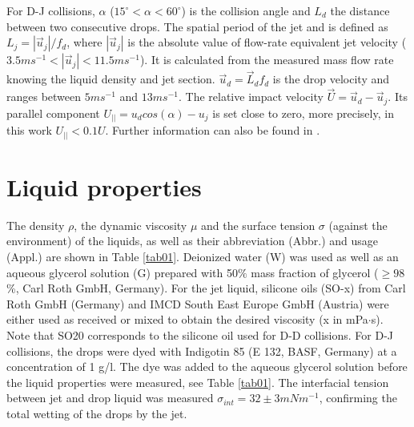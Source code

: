 \documentclass{article}
\begin{document}
For D-J collisions, $\alpha$ ($15^\circ < \alpha < 60^\circ$) is the collision angle and $L_{d}$  the distance between two consecutive drops. The spatial period of the jet and is defined as $L_j=|\vec{u}_j|/f_{d}$, where $|\vec{u}_j|$ is the absolute value of flow-rate equivalent jet velocity ($3.5 ms^{-1}<|\vec{u}_j|<11.5 ms^{-1}$). It is calculated from the measured mass flow rate knowing the liquid density and jet section. $\vec{u}_{d}=\vec{L}_{d}f_d$ is the drop velocity  and ranges between $5ms^{-1}$ and $13ms^{-1}$.  The relative impact velocity $\vec{U}=\vec{u}_{d}-\vec{u}_{j}$. Its parallel component $U_{||}=u_{d} cos(\alpha)-u_j$ is set close to zero, more precisely, in this work $U_{||}<0.1U$. Further information can also be found in \cite{ref:Baumgartner2020, ref:Baumgartner2020_PRF}.  

\section{Liquid properties}\label{appB}
 
The density $\rho$, the dynamic viscosity $\mu$ and the surface tension $\sigma$ (against the environment) of the liquids, as well as their abbreviation (Abbr.) and usage (Appl.) are shown in Table \ref{tab01}. Deionized water (W) was used as well as an aqueous glycerol solution (G) prepared with 50$\%$ mass fraction of glycerol ($\geq98$\%, Carl Roth GmbH, Germany). For the jet liquid,  silicone oils (SO-x) from Carl Roth GmbH (Germany) and IMCD South East Europe GmbH (Austria) were either used as received or mixed to obtain the desired viscosity (x in mPa$\cdot$s). Note that SO20 corresponds to the silicone oil used for D-D collisions. For D-J collisions, the drops were dyed with Indigotin 85 (E 132, BASF, Germany) at a concentration of 1 g/l. The dye was added to the aqueous glycerol solution before the liquid properties were measured, see Table \ref{tab01}.  The interfacial tension between jet and drop liquid was measured $\sigma_{int} = 32\pm 3 mNm^{-1}$, confirming the total wetting of the drops by the jet. 
\end{document}
